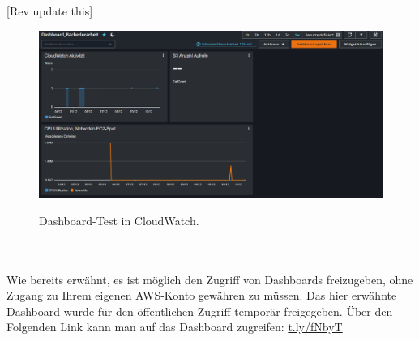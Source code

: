 [Rev update this]
\begin{figure}[h!]
  \centering
  \includegraphics[scale=0.4]{sources/CloudWatchDashboardTest}
  \caption[Dashboard-Test in CloudWatch]{}
  \label{fig:CloudWatchDashboardTest} 
  Dashboard-Test in CloudWatch.
\end{figure}
\\\\
Wie bereits erwähnt, es ist möglich den Zugriff von Dashboards freizugeben, ohne Zugang zu Ihrem eigenen AWS-Konto gewähren zu müssen. Das hier erwähnte Dashboard wurde für den öffentlichen Zugriff temporär freigegeben. Über den Folgenden Link kann man auf das Dashboard zugreifen: \url{t.ly/fNbyT} %
